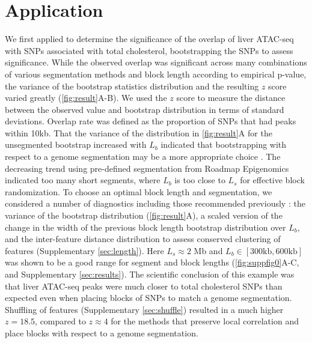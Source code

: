 \vspace*{-21pt}
\section{Application}

We first applied \bootranges to determine the significance of the
overlap of liver ATAC-seq
\citep{CURRIN20211169} with SNPs associated with total cholesterol,
bootstrapping the SNPs to assess significance.
While the observed overlap was significant across many combinations of
various segmentation methods and block length according to empirical p-value, 
the variance of the
bootstrap statistics distribution and the resulting $z$ score varied greatly
(\cref{fig:result}A-B).
We used the $z$ score to measure the distance between the observed
value and bootstrap distribution in terms of standard deviations.
Overlap rate was defined as the proportion of
SNPs that had peaks within 10kb.
That the variance of the distribution in \cref{fig:result}A for the
unsegmented bootstrap increased with $L_b$ indicated that
bootstrapping with respect to a genome
segmentation may be a more appropriate choice
\citep{bickel2010subsampling}. 
The decreasing trend using pre-defined segmentation from
Roadmap Epigenomics indicated too many short segments,
where $L_b$ is too close to $L_s$ for effective block randomization.
To choose an optimal block length and segmentation, 
we considered a number of diagnostics including
those recommended previously \citep{bickel2010subsampling}:
the variance of the bootstrap distribution (\cref{fig:result}A),
a scaled version of the change in the width of the previous block length
bootstrap distribution over $L_b$,
and the inter-feature distance distribution to assess conserved
clustering of features (Supplementary \cref{sec:length}).
Here $L_s \approx 2$ Mb and $L_b \in [300\textrm{kb},600\textrm{kb}]$ was 
shown to be a good range for segment and block
lengths (\cref{fig:suppfig0}A-C, and Supplementary \cref{sec:results}).
The scientific conclusion of this example was that liver ATAC-seq
peaks were
much closer to total cholesterol SNPs than expected even when placing
blocks of SNPs to match a genome segmentation.
Shuffling of features (Supplementary \cref{sec:shuffle})
resulted in a much higher $z = 18.5$, compared to $z \approx 4$ for
the methods that preserve local correlation and place blocks with
respect to a genome segmentation.

